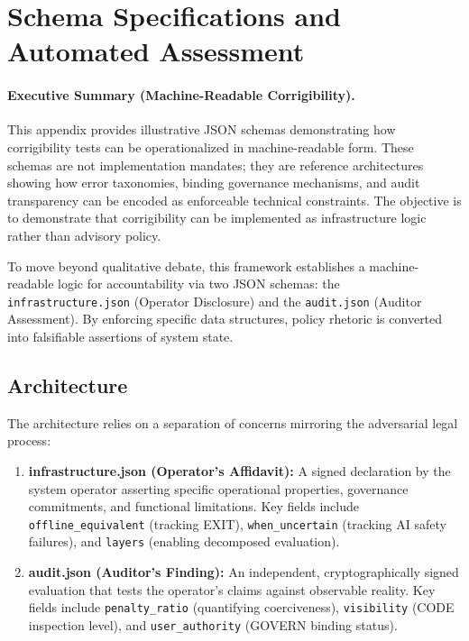 \documentclass{article}
\begin{document}
\section{Schema Specifications and Automated Assessment}
\label{appendix:schema}

\paragraph{Executive Summary (Machine-Readable Corrigibility).}
This appendix provides illustrative JSON schemas demonstrating how corrigibility tests can be operationalized in machine-readable form. These schemas are not implementation mandates; they are reference architectures showing how error taxonomies, binding governance mechanisms, and audit transparency can be encoded as enforceable technical constraints. The objective is to demonstrate that corrigibility can be implemented as infrastructure logic rather than advisory policy.

\medskip

To move beyond qualitative debate, this framework establishes a machine-readable logic for accountability via two JSON schemas: the \texttt{infrastructure.json} (Operator Disclosure) and the \texttt{audit.json} (Auditor Assessment). By enforcing specific data structures, policy rhetoric is converted into falsifiable assertions of system state.

\subsection{Architecture}

The architecture relies on a separation of concerns mirroring the adversarial legal process:

\begin{enumerate}[noitemsep]
    \item \textbf{infrastructure.json (Operator's Affidavit):} A signed declaration by the system operator asserting specific operational properties, governance commitments, and functional limitations. Key fields include \texttt{offline\_equivalent} (tracking EXIT), \texttt{when\_uncertain} (tracking AI safety failures), and \texttt{layers} (enabling decomposed evaluation).

    \item \textbf{audit.json (Auditor's Finding):} An independent, cryptographically signed evaluation that tests the operator's claims against observable reality. Key fields include \texttt{penalty\_ratio} (quantifying coerciveness), \texttt{visibility} (CODE inspection level), and \texttt{user\_authority} (GOVERN binding status).
\end{enumerate}
\end{document}
